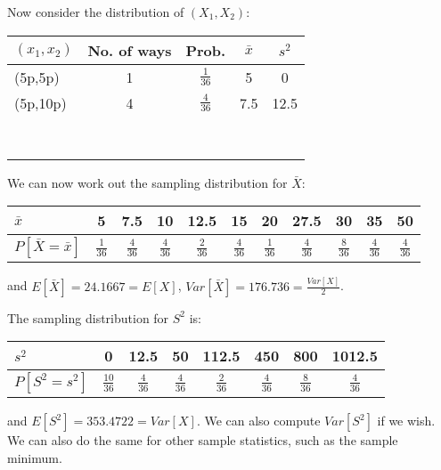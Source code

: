 \documentclass[12pt]{article}
\theoremstyle{break}
\begin{document}
Now consider the distribution of $(X_{1},X_{2})$:
\begin{center}
\begin{tabular}{|l|c|c|c|c|}
  \hline
  $(x_{1},x_{2})$ & No. of ways & Prob. & $\bar{x}$ & $s^{2}$ \\ \hline
  (5p,5p) & 1 & $\frac{1}{36}$ & 5 & 0 \\[8pt] \hline
  (5p,10p)& 4 & $\frac{4}{36}$ & 7.5 & 12.5 \\[8pt] \hline
   &  &  &  &  \\[8pt] \hline
   &  &  &  & \\[8pt] \hline
   &  &  &  &  \\[8pt] \hline
   &  &  &  &  \\[8pt] \hline
   &  &  &  &  \\[8pt]\hline
   &  &  &  &  \\[8pt]\hline
   &  &  &  &  \\[8pt]\hline
   &  &  &  &  \\[8pt]
  \hline
\end{tabular}
\end{center}
We can now work out the sampling distribution for $\bar{X}$:
\begin{center}
\begin{tabular}{|l|c|c|c|c|c|c|c|c|c|c|}
  \hline
  $\bar{x}$ & 5 & 7.5 & 10 & 12.5 & 15 & 20 & 27.5 & 30 & 35 & 50 \\ \hline
  $P[\bar{X}=\bar{x}]$ & $\frac{1}{36}$ & $\frac{4}{36}$ & $\frac{4}{36}$ & $\frac{2}{36}$ & $\frac{4}{36}$ & $\frac{1}{36}$ & $\frac{4}{36}$ & $\frac{8}{36}$ & $\frac{4}{36}$ & $\frac{4}{36}$ \\
  \hline
\end{tabular}
\end{center}
and $E[\bar{X}]=24.1667=E[X]$, $ \displaystyle Var[\bar{X}]=176.736=\frac{Var[X]}{2}$.

The sampling distribution for $S^{2}$ is:
\begin{center}
\begin{tabular}{|l|c|c|c|c|c|c|c|}
  \hline
  $s^{2}$ & 0 & 12.5 & 50 & 112.5 & 450 & 800 & 1012.5 \\ \hline
  $P[S^{2}=s^{2}]$ & $\frac{10}{36}$ & $\frac{4}{36}$ & $\frac{4}{36}$ & $\frac{2}{36}$ & $\frac{4}{36}$ & $\frac{8}{36}$ & $\frac{4}{36}$ \\
  \hline
\end{tabular}
\end{center}
and $E[S^{2}]=353.4722=Var[X]$. We can also compute $Var[S^2]$ if we wish. We can also do the same for other sample statistics, such as the sample minimum.
\end{document}
